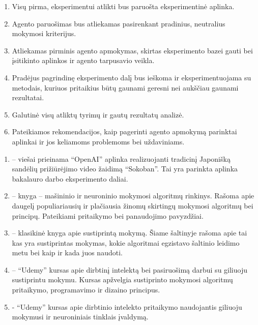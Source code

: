 \documentclass{VUMIFPSbakalaurinis}
\begin{document}
\begin{enumerate}
	\item Visų pirma, eksperimentui atlikti bus paruošta eksperimentinė aplinka.
	\item Agento paruošimas bus atliekamas pasirenkant pradinius, neutralius mokymosi kriterijus.
	\item Atliekamas pirminis agento apmokymas, skirtas eksperimento bazei gauti bei įsitikinto aplinkos ir agento tarpusavio veikla. 
	\item Pradėjus pagrindinę eksperimento dalį bus ieškoma ir eksperimentuojama su metodais, kuriuos pritaikius būtų gaunami geresni nei aukščiau gaunami rezultatai.
	\item Galutinė visų atliktų tyrimų ir gautų rezultatų analizė.
	\item Pateikiamos rekomendacijos, kaip pagerinti agento apmokymą parinktai aplinkai ir jos keliamoms problemoms bei uždaviniams.
\end{enumerate}



\begin{enumerate}
	\item \textbf{\cite{gym}} -- viešai prieinama \enquote{OpenAI} \cite{openai} aplinka realizuojanti tradicinį Japonišką sandėlių prižiūrėjimo video žaidimą \enquote{Sokoban}. Tai yra parinkta aplinka bakalauro darbo eksperimento daliai.
	\item \textbf{\cite{handson}} -- knyga -- mašininio ir neuroninio mokymosi algoritmų rinkinys. Rašoma apie daugelį populiariausių ir plačiausia žinomų skirtingų mokymosi algoritmų bei principų. Pateikiami pritaikymo bei panaudojimo pavyzdžiai.
	\item \textbf{\cite{algorithms}} -- klasikinė knyga apie sustiprintą mokymą. Šiame šaltinyje rašoma apie tai kas yra sustiprintas mokymas, kokie algoritmai egzistavo šaltinio leidimo metu bei kaip ir kada juos naudoti.
	\item \textbf{\cite{udemy1}} -- \enquote{Udemy} \cite{udemy} kursas apie dirbtinį intelektą bei pasiruošimą darbui su giliuoju sustiprintu mokymu. Kursas apžvelgia sustiprinto mokymosi algoritmų pritaikymo, programavimo ir dizaino principus.
	\item \textbf{\cite{udemy2}} - \enquote{Udemy} \cite{udemy} kursas apie dirbtinio intelekto pritaikymo naudojantis giliuoju mokymusi ir neuroniniais tinklais įvaldymą.	
\end{enumerate}
\end{document}
